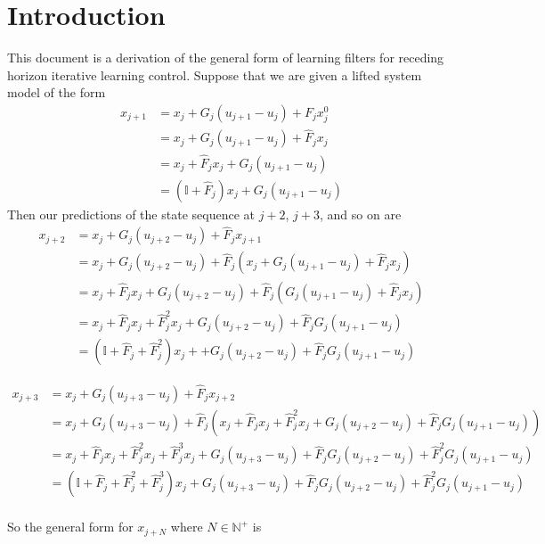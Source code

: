 \documentclass{article}
\begin{document}
\section{Introduction}
This document is a derivation of the general form of learning filters for receding horizon iterative learning control.  Suppose that we are given a lifted system model of the form
\begin{align}
x_{j+1} 
& = x_j + G_j(u_{j+1} - u_j) + F_j x^0_j\\
& = x_j + G_j(u_{j+1} - u_j) + \hat{F}_j x_j\\
& = x_j + \hat{F}_j x_j + G_j(u_{j+1} - u_j) \\
& = \left(\mathbb{I}+\hat{F}_j\right)x_j + G_j(u_{j+1} - u_j)
\end{align}
Then our predictions of the state sequence at $j+2$, $j+3$, and so on are
\begin{align}
x_{j+2} 
& = x_j + G_j(u_{j+2}-u_j) + \hat{F}_jx_{j+1}\\
& = x_j + G_j(u_{j+2}-u_j) + \hat{F}_j\left(x_j + G_j(u_{j+1} - u_j) + \hat{F}_j x_j\right)\\
& = x_j + \hat{F}_j x_j    + G_j(u_{j+2}-u_j) + \hat{F}_j\left(G_j(u_{j+1} - u_j) + \hat{F}_j x_j\right)\\
& = x_j + \hat{F}_j x_j + \hat{F}_j^2 x_j    + G_j(u_{j+2}-u_j) + \hat{F}_j G_j(u_{j+1} - u_j)\\
& = \left(\mathbb{I} + \hat{F}_j + \hat{F}_j^2 \right)x_j +     + G_j(u_{j+2}-u_j) + \hat{F}_j G_j(u_{j+1} - u_j)
\end{align}

\begin{align}
x_{j+3} 
& = x_j + G_j(u_{j+3}-u_j) + \hat{F}_jx_{j+2}\\
& = x_j + G_j(u_{j+3}-u_j) + \hat{F}_j\left(x_j + \hat{F}_j x_j + \hat{F}_j^2 x_j    + G_j(u_{j+2}-u_j) + \hat{F}_j G_j(u_{j+1} - u_j)\right)\\
& = x_j + \hat{F}_jx_j + \hat{F}_j^2 x_j + \hat{F}_j^3x_j + G_j(u_{j+3}-u_j) + \hat{F}_j G_j(u_{j+2}-u_j) + \hat{F}_j^2 G_j(u_{j+1} - u_j)\\
& = \left(\mathbb{I} + \hat{F}_j + \hat{F}_j^2  + \hat{F}_j^3\right)x_j  + G_j(u_{j+3}-u_j) + \hat{F}_j G_j(u_{j+2}-u_j) + \hat{F}_j^2 G_j(u_{j+1} - u_j)\\
\end{align}

So the general form for $x_{j+N}$ where $N\in \mathbb{N}^+$ is
\end{document}

